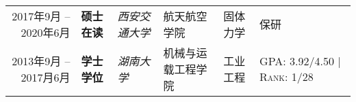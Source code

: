 %
%



\begin{tabular}{rlllll}	
	\textsc{2017年9月 --2020年6月}			  & \textbf{硕士在读} &\emph{西安交通大学} &航天航空学院 &固体力学 &保研\\

	\textsc{2013年9月 --2017月6月} 	&  \textbf{学士学位} &\emph{湖南大学} &机械与运载工程学院 &工业工程 &\textsc{GPA}: 3.92/4.50 | \textsc{Rank}: 1/28		
\end{tabular}